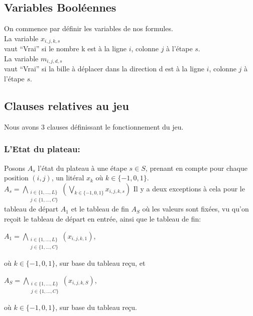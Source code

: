 \documentclass[utf8]{article}
\begin{document}
\subsection{Variables  Booléennes}
On commence par définir les variables de nos formules. 
\\La variable $x_{i,j,k,s}$
\\vaut “Vrai” si le nombre k est à la ligne $i$, colonne $j$ à l'étape $s$. 
\\La variable $m_{i,j,d,s}$
\\vaut “Vrai” si la bille à déplacer dans la direction d est à la ligne $i$, colonne $j$ à l'étape $s$. 


\subsection{Clauses relatives au jeu}
Nous avons 3 clauses définissant le fonctionnement du jeu.

\subsubsection{L'Etat du plateau: } 
Posons $A_s$ l'état du plateau à une étape $s\in S$, prenant en compte pour chaque position $(i,j)$, un litéral $x_k$ où $k\in \{-1,0,1\}$. \newline
$A_s = {\underset{\substack{i\in\{1,...,L\}\\j\in\{1,...,C\}}}{\bigwedge}}({\underset{k\in\{-1,0,1\}}{\bigvee}}x_{i,j,k,s})$ \newline
Il y a deux exceptions à cela pour le tableau de départ $A_1$ et le tableau de fin $A_S$ où les valeurs sont fixées, vu qu'on reçoit le tableau de départ en entrée, ainsi que le tableau de fin: 

\newline

$A_1 = {\underset{\substack{i\in\{1,...,L\}\\j\in\{1,...,C\}}}{\bigwedge}}(x_{i,j,k,1})$, 

où $k\in\{-1,0,1\}$, sur base du tableau reçu, et 

\newline

$A_S = {\underset{\substack{i\in\{1,...,L\}\\j\in\{1,...,C\}}}{\bigwedge}}(x_{i,j,k,S})$, 

où $k\in\{-1,0,1\}$, sur base du tableau reçu.

\begin{comment}

\subsubsection{\colorbox{orange}{non-case}}
Considérant une case (i,j)
variable 
x$_{i,j,k}$, 
les cases aux positions 
(i,j-1) variable x$_{i,j-1,k}$ 
et (i,j+1) variable x$_{i,j+1,k^\prime}$, 
sont des voisines
si et seulement si k,$k^ {\prime}$ != -1

\end{comment}
\end{document}
